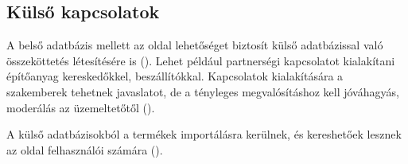 \subsection{Külső kapcsolatok}
A belső adatbázis mellett az oldal lehetőséget biztosít külső adatbázissal való összeköttetés létesítésére is (). Lehet például partnerségi kapcsolatot kialakítani építőanyag kereskedőkkel, beszállítókkal. Kapcsolatok kialakítására a szakemberek tehetnek javaslatot, de a tényleges megvalósításhoz kell jóváhagyás, moderálás az üzemeltetőtől ().


A külső adatbázisokból a termékek importálásra kerülnek, és kereshetőek lesznek az oldal felhasználói számára ().
